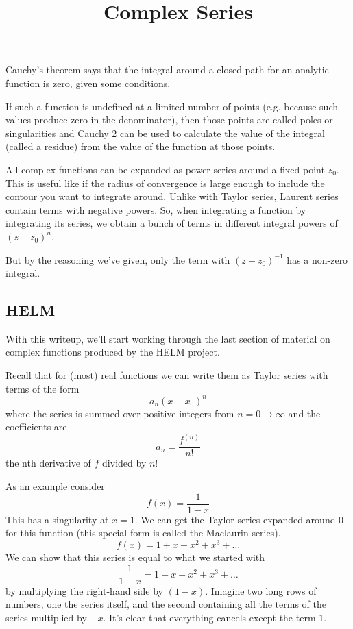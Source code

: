 \documentclass[11pt, oneside]{article}   	%
\title{Complex Series}
\date{}							%
\begin{document}
\maketitle
\Large
Cauchy's theorem says that the integral around a closed path for an analytic function is zero, given some conditions.

If such a function is undefined at a limited number of points (e.g. because such values produce zero in the denominator), then those points are called poles or singularities and Cauchy 2 can be used to calculate the value of the integral (called a residue) from the value of the function at those points.

All complex functions can be expanded as power series around a fixed point $z_0$.  This is useful like if the radius of convergence is large enough to include the contour you want to integrate around.  Unlike with Taylor series, Laurent series contain terms with negative powers.  So, when integrating a function by integrating its series, we obtain a bunch of terms in different integral powers of $(z-z_0)^n$.

But by the reasoning we've given, only the term with $(z-z_0)^{-1}$ has a non-zero integral.

\subsection*{HELM}

With this writeup, we'll start working through the last section of material on complex functions produced by the HELM project.

Recall that for (most) real functions we can write them as Taylor series with terms of the form
\[ a_n (x-x_0)^n \] 
where the series is summed over positive integers from $n = 0 \rightarrow \infty$ and the coefficients are
\[ a_n = \frac{f^{(n)}}{n!} \]
the nth derivative of $f$ divided by $n!$

As an example consider
\[ f(x) = \frac{1}{1 - x} \]
This has a singularity at $x = 1$.  We can get the Taylor series expanded around $0$ for this function (this special form is called the Maclaurin series).
\[ f(x) = 1 + x + x^2 + x^3 + \dots \]
We can show that this series is equal to what we started with
\[ \frac{1}{1 - x} = 1 + x + x^2 + x^3 + \dots \]
by multiplying the right-hand side by $(1-x)$.  Imagine two long rows of numbers, one the series itself, and the second containing all the terms of the series multiplied by $-x$.  It's clear that everything cancels except the term $1$.
\end{document}
